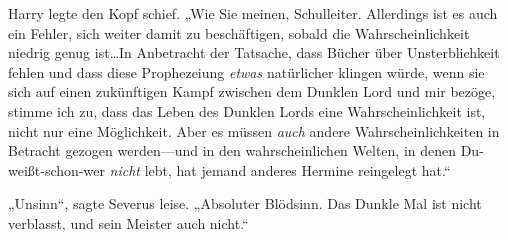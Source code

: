 Harry legte den Kopf schief. „Wie Sie meinen, Schulleiter. Allerdings ist es auch ein Fehler, sich weiter damit zu beschäftigen, sobald die Wahrscheinlichkeit niedrig genug ist…In Anbetracht der Tatsache, dass Bücher über Unsterblichkeit fehlen und dass diese Prophezeiung \emph{etwas} natürlicher klingen würde, wenn sie sich auf einen zukünftigen Kampf zwischen dem Dunklen Lord und mir bezöge, stimme ich zu, dass das Leben des Dunklen Lords eine Wahrscheinlichkeit ist, nicht nur eine Möglichkeit. Aber es müssen \emph{auch} andere Wahrscheinlichkeiten in Betracht gezogen werden—und in den wahrscheinlichen Welten, in denen Du-weißt-schon-wer \emph{nicht} lebt, hat jemand anderes Hermine reingelegt hat.“

„Unsinn“, sagte Severus leise. „Absoluter Blödsinn. Das Dunkle Mal ist nicht verblasst, und sein Meister auch nicht.“

